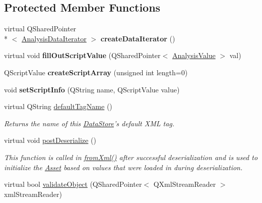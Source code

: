 \subsection*{Protected Member Functions}
\begin{DoxyCompactItemize}
\item 
\hypertarget{class_picto_1_1_analysis_data_source_dep_a645bf9964f2ed7498ec4926d4a5269b7}{virtual Q\-Shared\-Pointer\\*
$<$ \hyperlink{class_picto_1_1_analysis_data_iterator}{Analysis\-Data\-Iterator} $>$ {\bfseries create\-Data\-Iterator} ()}\label{class_picto_1_1_analysis_data_source_dep_a645bf9964f2ed7498ec4926d4a5269b7}

\item 
\hypertarget{class_picto_1_1_analysis_data_source_dep_a5962782b011ec20e29888691dfbb9141}{virtual void {\bfseries fill\-Out\-Script\-Value} (Q\-Shared\-Pointer$<$ \hyperlink{struct_picto_1_1_analysis_value}{Analysis\-Value} $>$ val)}\label{class_picto_1_1_analysis_data_source_dep_a5962782b011ec20e29888691dfbb9141}

\item 
\hypertarget{class_picto_1_1_analysis_data_source_dep_aed9d2ed4bfb95bb17603887039e8f53c}{Q\-Script\-Value {\bfseries create\-Script\-Array} (unsigned int length=0)}\label{class_picto_1_1_analysis_data_source_dep_aed9d2ed4bfb95bb17603887039e8f53c}

\item 
\hypertarget{class_picto_1_1_analysis_data_source_dep_aa36d36652debedb3832fe0802d646f90}{void {\bfseries set\-Script\-Info} (Q\-String name, Q\-Script\-Value value)}\label{class_picto_1_1_analysis_data_source_dep_aa36d36652debedb3832fe0802d646f90}

\item 
virtual Q\-String \hyperlink{class_picto_1_1_analysis_data_source_dep_a05ba9d8f1a12e9fd951d49ef3cf6dbd4}{default\-Tag\-Name} ()
\begin{DoxyCompactList}\small\item\em Returns the name of this \hyperlink{class_picto_1_1_data_store}{Data\-Store}'s default X\-M\-L tag. \end{DoxyCompactList}\item 
virtual void \hyperlink{class_picto_1_1_analysis_data_source_dep_a3e0d7b3b0c784e17c8fa3504705367ba}{post\-Deserialize} ()
\begin{DoxyCompactList}\small\item\em This function is called in \hyperlink{class_picto_1_1_asset_a8bed4da09ecb1c07ce0dab313a9aba67}{from\-Xml()} after successful deserialization and is used to initialize the \hyperlink{class_picto_1_1_asset}{Asset} based on values that were loaded in during deserialization. \end{DoxyCompactList}\item 
\hypertarget{class_picto_1_1_analysis_data_source_dep_a1867f1cb91c2f5e24c93816a93460260}{virtual bool \hyperlink{class_picto_1_1_analysis_data_source_dep_a1867f1cb91c2f5e24c93816a93460260}{validate\-Object} (Q\-Shared\-Pointer$<$ Q\-Xml\-Stream\-Reader $>$ xml\-Stream\-Reader)}\label{class_picto_1_1_analysis_data_source_dep_a1867f1cb91c2f5e24c93816a93460260}


\end{DoxyCompactItemize}
